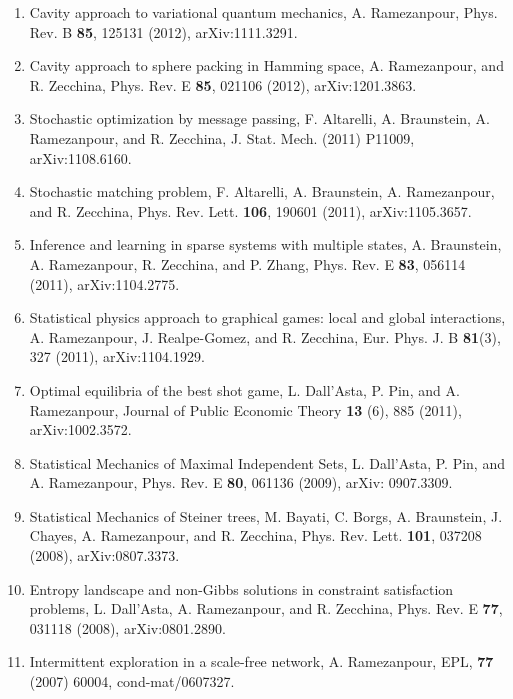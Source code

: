 \documentclass[aps,preprint]{revtex4-1}
\begin{document}
\begin{enumerate}
\item  Cavity approach to variational quantum mechanics, A. Ramezanpour, Phys. Rev. B \textbf{85}, 125131 (2012), arXiv:1111.3291. 

\item  Cavity approach to sphere packing in Hamming space, A. Ramezanpour, and R. Zecchina, Phys. Rev. E \textbf{85}, 021106 (2012), arXiv:1201.3863. 

\item  Stochastic optimization by message passing, F. Altarelli, A. Braunstein, A. Ramezanpour, and R. Zecchina, J. Stat. Mech. (2011) P11009, arXiv:1108.6160. 

\item  Stochastic matching problem, F. Altarelli, A. Braunstein, A. Ramezanpour, and R. Zecchina, Phys. Rev. Lett. \textbf{106}, 190601 (2011), arXiv:1105.3657.

\item  Inference and learning in sparse systems with multiple states, A. Braunstein, A. Ramezanpour, R. Zecchina, and P. Zhang, Phys. Rev. E \textbf{83}, 056114 (2011), arXiv:1104.2775.

\item  Statistical physics approach to graphical games: local and global interactions, A. Ramezanpour, J. Realpe-Gomez, and R. Zecchina, Eur. Phys. J. B \textbf{81}(3), 327 (2011), arXiv:1104.1929.

\item  Optimal equilibria of the best shot game, L. Dall'Asta, P. Pin, and A. Ramezanpour, Journal of Public Economic Theory \textbf{13} (6), 885 (2011), arXiv:1002.3572.

\item  Statistical Mechanics of Maximal Independent Sets, L. Dall'Asta, P. Pin, and A. Ramezanpour, Phys. Rev. E \textbf{80}, 061136  (2009), arXiv: 0907.3309.

\item  Statistical Mechanics of Steiner trees, M. Bayati, C. Borgs, A. Braunstein, J. Chayes, A. Ramezanpour, and R. Zecchina,  Phys. Rev. Lett. \textbf{101}, 037208 (2008), arXiv:0807.3373.


\item   Entropy landscape and non-Gibbs solutions in constraint satisfaction problems, L. Dall'Asta, A. Ramezanpour, and R. Zecchina, Phys. Rev. E \textbf{77}, 031118 (2008), arXiv:0801.2890.


\item   Intermittent exploration in a scale-free network, A. Ramezanpour, EPL, \textbf{77} (2007) 60004, cond-mat/0607327.


\end{enumerate}
\end{document}

